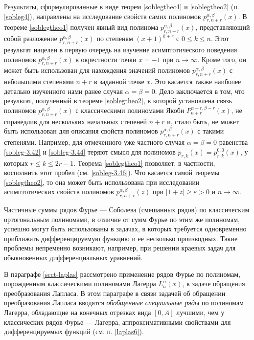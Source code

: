 Результаты, сформулированные в виде теорем \ref{soblegtheo1} и \ref{soblegtheo2} (п.\ref{sobleg4}), направлены на исследование свойств самих полиномов $p^{\alpha,\beta}_{r,n+r}(x)$.   В теореме \ref{soblegtheo1} получен явный вид полинома $p^{\alpha,\beta}_{r,n+r}(x)$, представляющий собой разложение $p^{\alpha,\beta}_{r,n+r}(x)$ по степеням $(x+1)^{k+r}$ с $0\le k\le n$. Этот результат нацелен в первую очередь на изучение асимптотического поведения полиномов  $p^{\alpha,\beta}_{r,n+r}(x)$  в окрестности точки $x=-1$ при $n\to\infty$. Кроме того, он может быть использован для нахождения значений полиномов $p^{\alpha,\beta}_{r,n+r}(x)$ с небольшими степенями $n+r$ в заданной точке $x$. Это касается также наиболее детально изученного нами ранее случая $\alpha=\beta=0$.  Дело заключается в том, что результат, полученный в теореме \ref{soblegtheo2}, в которой установлена связь полиномов $p^{\alpha,\beta}_{r,n+r}(x)$ с классическими полиномами Якоби $P_{n+r}^{\alpha-r,\beta-r}(x)$, не справедлив для нескольких начальных степеней $n+r$ и, стало быть, не может быть использован для описания свойств полиномов $p^{\alpha,\beta}_{r,n+r}(x)$ с такими степенями. Например, для отмеченного уже частного случая $\alpha=\beta=0$ равенства \eqref{sobleg-3.42} и \eqref{sobleg-3.44} теряют смысл для полиномов $p_{r,k}(x)=p^{0,0}_{r,k}(x)$, у которых $r\le k\le 2r-1$. Теорема \ref{soblegtheo1} позволяет, в частности, восполнить этот пробел (см. \eqref{sobleg-3.46}). Что касается самой теоремы \ref{soblegtheo2}, то она может быть использована при исследовании асимптотических свойств полиномов $p^{\alpha,\beta}_{r,n+r}(z)$ при $|1+z|\ge\varepsilon>0$ и $n\to\infty$. 

Частичные суммы рядов Фурье --- Соболева (смешанных рядов) по классическим ортогональным полиномами, в отличие от сумм Фурье по этим же полиномам, успешно могут быть использованы в задачах, в которых требуется одновременно приближать дифференцируемую функцию и ее несколько производных. Такие проблемы непременно возникают, например, при решении краевых задач для обыкновенных дифференциальных уравнений.


В параграфе \ref{sect-laplas} рассмотрено применение рядов Фурье по полиномам, порожденным классическими полиномами Лагерра $L_n^\alpha(x)$, к задаче обращения преобразования Лапласа. В этом параграфе в связи задачей об обращении преобразования Лапласа вводятся \textit{обобщенные специальные ряды} по полиномам Лагерра, обладающие на конечных отрезках вида $[0,A]$ лучшими, чем у классических рядов Фурье --- Лагерра, аппроксимативными свойствами для дифференцируемых функций   (см. п. \ref{laplas6}).

